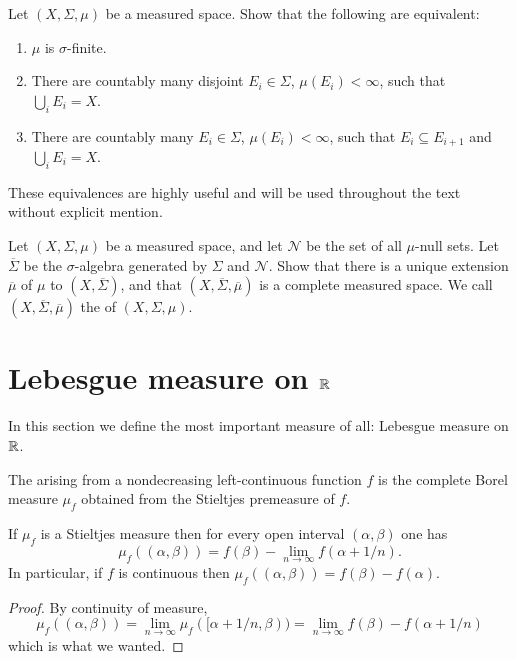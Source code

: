 \begin{exercise}
Let $(X, \Sigma, \mu)$ be a measured space. Show that the following are equivalent:
\begin{enumerate}
\item $\mu$ is $\sigma$-finite.
\item There are countably many disjoint $E_{i} \in \Sigma$, $\mu(E_{i}) < \infty$, such that $\bigcup_{i} E_{i} = X$.
\item There are countably many $E_{i} \in \Sigma$, $\mu(E_{i}) < \infty$, such that $E_{i} \subseteq E_{i+1}$ and $\bigcup_{i} E_{i} = X$.
\end{enumerate}
These equivalences are highly useful and will be used throughout the text without explicit mention.
\end{exercise}

\begin{exercise}
Let $(X, \Sigma, \mu)$ be a measured space, and let $\mathcal N$ be the set of all $\mu$-null sets.
Let $\overline \Sigma$ be the $\sigma$-algebra generated by $\Sigma$ and $\mathcal N$.
Show that there is a unique extension $\overline \mu$ of $\mu$ to $(X, \overline \Sigma)$, and that $(X, \overline \Sigma, \overline \mu)$ is a complete measured space.
We call $(X, \overline \Sigma, \overline \mu)$ the  of $(X, \Sigma, \mu)$.
\end{exercise}

\section{Lebesgue measure on $\mathbb{R}$}
In this section we define the most important measure of all: Lebesgue measure on $\mathbb{R}$.

\begin{definition}
The  arising from a nondecreasing left-continuous function $f$ is the complete Borel measure $\mu_{f}$ obtained from the Stieltjes premeasure of $f$.
\end{definition}

\begin{lemma}
If $\mu_{f}$ is a Stieltjes measure then for every open interval $(\alpha, \beta)$ one has
\[\mu_{f}((\alpha, \beta)) = f(\beta) - \lim_{n \to \infty} f(\alpha + 1/n).\]
In particular, if $f$ is continuous then $\mu_{f}((\alpha, \beta)) = f(\beta) - f(\alpha)$.
\end{lemma}
\begin{proof}
By continuity of measure,
\[\mu_{f}((\alpha, \beta)) = \lim_{n \to \infty} \mu_{f}([\alpha + 1/n, \beta)) = \lim_{n \to \infty} f(\beta) - f(\alpha + 1/n)\]
which is what we wanted.
\end{proof}

